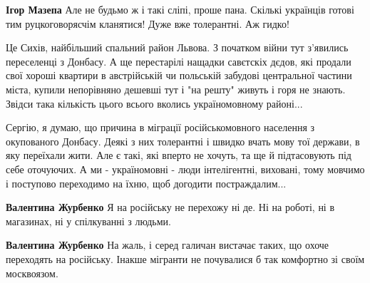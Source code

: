 \begin{itemize}
\begin{itemize}
\textbf{Ігор Мазепа} Але не будьмо ж і такі сліпі, проше пана. Скількі
українців готові тим руцкоговорясчім кланятися! Дуже вже толерантні. Аж гидко!
\end{itemize}

 

Це Сихів, найбільший спальний район Львова. З початком війни тут з'явились
переселенці з Донбасу. А ще перестарілі нащадки савєтскіх дєдов, які продали
свої хороші квартири в австрійській чи польській забудові центральної частини
міста, купили непорівняно дешевші тут і "на решту" живуть і горя не знають.
Звідси така кількість цього всього вколись україномовному районі...


 

Сергію, я думаю, що причина в міграції російськомовного населення з окупованого
Донбасу. Деякі з них толерантні і швидко вчать мову тої держави, в яку
переїхали жити. Але є такі, які вперто не хочуть, та ще й підтасовують під себе
оточуючих. А ми - україномовні - люди інтелігентні, виховані, тому мовчимо і
поступово переходимо на їхню, щоб догодити постраждалим...

\begin{itemize}
 
\textbf{Валентина Журбенко} Я на російську не перехожу ні де. Ні на роботі, ні в магазинах, ні у спілкуванні з людьми.

 
\textbf{Валентина Журбенко} На жаль, і серед галичан вистачає таких, що охоче
переходять на російську. Інакше мігранти не почувалися б так комфортно зі своїм
москвоязом.


\end{itemize}
\end{itemize}
